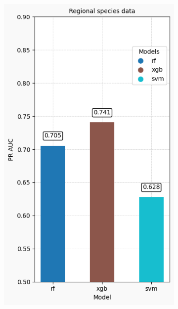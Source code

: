 \documentclass{article}
\begin{document}
\begin{figure}[H]
\begin{subfigure}[b]{0.15\linewidth}
        \includegraphics[width=\linewidth]{Regional species data.png}
        \caption{}
        \label{fig:regional_species}
    \end{subfigure}
    \hspace{0.1cm}
    \begin{subfigure}[b]{0.15\linewidth}
        \centering

\end{subfigure}
\end{figure}
\end{document}
